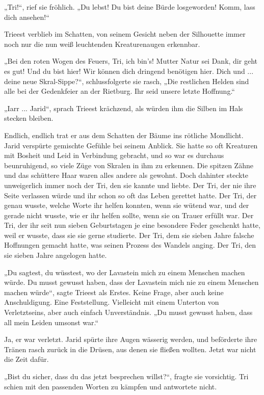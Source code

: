 „Tri!“, rief sie fröhlich. „Du lebst! Du bist deine Bürde losgeworden! Komm, lass dich ansehen!“

Trieest verblieb im Schatten, von seinem Gesicht neben der Silhouette immer noch nur die nun weiß leuchtenden Kreaturenaugen erkennbar.

„Bei den roten Wogen des Feuers, Tri, ich bin’s! Mutter Natur sei Dank, dir geht es gut! Und du bist hier! Wir können dich dringend benötigen hier. Dich und ... deine neue Skral-Sippe?“, schlussfolgerte sie rasch, „Die restlichen Helden sind alle bei der Gedenkfeier an der Rietburg. Ihr seid unsere letzte Hoffnung.“

„Iarr ... Jarid“, sprach Trieest krächzend, als würden ihm die Silben im Hals stecken bleiben.

Endlich, endlich trat er aus dem Schatten der Bäume ins rötliche Mondlicht. Jarid verspürte gemischte Gefühle bei seinem Anblick. Sie hatte so oft Kreaturen mit Bosheit und Leid in Verbindung gebracht, und so war es durchaus beunruhigend, so viele Züge von Skralen in ihm zu erkennen. Die spitzen Zähne und das schüttere Haar waren alles andere als gewohnt. Doch dahinter steckte unweigerlich immer noch der Tri, den sie kannte und liebte. Der Tri, der nie ihre Seite verlassen würde und ihr schon so oft das Leben gerettet hatte. Der Tri, der genau wusste, welche Worte ihr helfen konnten, wenn sie wütend war, und der gerade nicht wusste, wie er ihr helfen sollte, wenn sie on Trauer erfüllt war. Der Tri, der ihr seit nun sieben Geburtstagen je eine besondere Feder geschenkt hatte, weil er wusste, dass sie sie gerne studierte. Der Tri, dem sie sieben Jahre falsche Hoffnungen gemacht hatte, was seinen Prozess des Wandels anging. Der Tri, den sie sieben Jahre angelogen hatte.

„Du sagtest, du wüsstest, wo der Lavastein mich zu einem Menschen machen würde. Du musst gewusst haben, dass der Lavastein mich nie zu einem Menschen machen würde“, sagte Trieest als Erstes. Keine Frage, aber auch keine Anschuldigung. Eine Feststellung. Vielleicht mit einem Unterton von Verletztseins, aber auch einfach Unverständnis. „Du musst gewusst haben, dass all mein Leiden umsonst war.“

Ja, er war verletzt. Jarid spürte ihre Augen wässerig werden, und beförderte ihre Tränen rasch zurück in die Drüsen, aus denen sie fließen wollten. Jetzt war nicht die Zeit dafür.

„Bist du sicher, dass du das jetzt besprechen willst?“, fragte sie vorsichtig. Tri schien mit den passenden Worten zu kämpfen und antwortete nicht.


